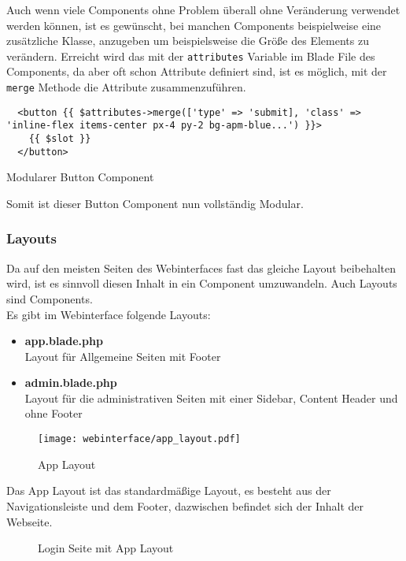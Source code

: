 Auch wenn viele Components ohne Problem überall ohne Veränderung verwendet
werden können, ist es gewünscht, bei manchen Components beispielweise eine
zusätzliche Klasse, anzugeben um beispielsweise die Größe des Elements zu verändern. Erreicht
wird das mit der \verb|attributes| Variable im Blade File des Components, da
aber oft schon Attribute definiert sind, ist es möglich, mit der \verb|merge|
Methode die Attribute zusammenzuführen.

\begin{listing}[H]
  \begin{verbatim}
  <button {{ $attributes->merge(['type' => 'submit], 'class' => 'inline-flex items-center px-4 py-2 bg-apm-blue...') }}>
    {{ $slot }}
  </button>
  \end{verbatim}
  \caption{Modularer Button Component}
\end{listing}

Somit ist dieser Button Component nun vollständig Modular.

\subsubsection{Layouts}

Da auf den meisten Seiten des Webinterfaces fast das gleiche Layout beibehalten
wird, ist es sinnvoll diesen Inhalt in ein Component umzuwandeln. Auch Layouts sind
Components.\\

Es gibt im Webinterface folgende Layouts:

\begin{itemize}
  \item \textbf{app.blade.php}\\
  Layout für Allgemeine Seiten mit Footer
  \item \textbf{admin.blade.php}\\
  Layout für die administrativen Seiten mit einer Sidebar, Content Header und
  ohne Footer
\end{itemize}

\begin{figure}[H]
  \centering
  \texttt{[image: webinterface/app\_layout.pdf]}
  \caption{App Layout}
\end{figure}

Das App Layout ist das standardmäßige Layout, es besteht aus der
Navigationsleiste und dem Footer, dazwischen befindet sich der Inhalt der Webseite.

\begin{figure}[H]
  \centering
  \caption{Login Seite mit App Layout}
  \label{fig:login_site}
\end{figure}

